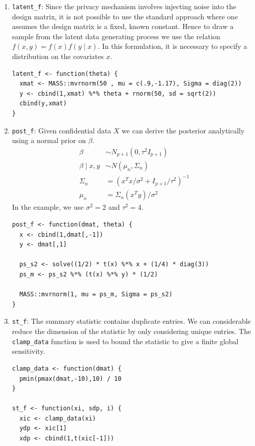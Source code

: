\begin{enumerate}
\def\labelenumi{\arabic{enumi}.}
\item
  \texttt{latent\_f}: Since the privacy mechanism involves injecting noise into the design
  matrix, it is not possible to use the standard approach where one assumes the design
  matrix is a fixed, known constant. Hence to draw a sample from the latent data generating
  process we use the relation \(f(x,y) = f(x)f(y \mid x)\). In this formulation,
  it is necessary to specify a distribution on the covariates \(x\).

\begin{verbatim}
latent_f <- function(theta) {
  xmat <- MASS::mvrnorm(50 , mu = c(.9,-1.17), Sigma = diag(2))
  y <- cbind(1,xmat) %*% theta + rnorm(50, sd = sqrt(2))
  cbind(y,xmat)
}
\end{verbatim}
\item
  \texttt{post\_f}: Given confidential data \(X\) we can derive the posterior analytically
  using a normal prior on \(\beta\).
  \[
  \begin{aligned}
  \beta &\sim N_{p+1}(0, \tau^2 I_{p+1})\\
  \beta \mid x,y &\sim N(\mu_n, \Sigma_n)\\
  \Sigma_n &= (x^Tx/\sigma^2 + I_{p+1}/\tau^2)^{-1}\\
  \mu_n &= \Sigma_n(x^Ty)/\sigma^2
  \end{aligned}
  \]
  In the example, we use \(\sigma^2 = 2\) and \(\tau^2 = 4\).

\begin{verbatim}
post_f <- function(dmat, theta) {
  x <- cbind(1,dmat[,-1])
  y <- dmat[,1]

  ps_s2 <- solve((1/2) * t(x) %*% x + (1/4) * diag(3))
  ps_m <- ps_s2 %*% (t(x) %*% y) * (1/2)

  MASS::mvrnorm(1, mu = ps_m, Sigma = ps_s2)
}
\end{verbatim}
\item
  \texttt{st\_f}: The summary statistic contains duplicate
  entries. We can considerable reduce the dimension of the
  statistic by only considering unique entries. The \texttt{clamp\_data}
  function is used to bound the statistic to give a finite
  global sensitivity.

\begin{verbatim}
clamp_data <- function(dmat) {
  pmin(pmax(dmat,-10),10) / 10
}

st_f <- function(xi, sdp, i) {
  xic <- clamp_data(xi)
  ydp <- xic[1]
  xdp <- cbind(1,t(xic[-1]))


\end{verbatim}
\end{enumerate}

